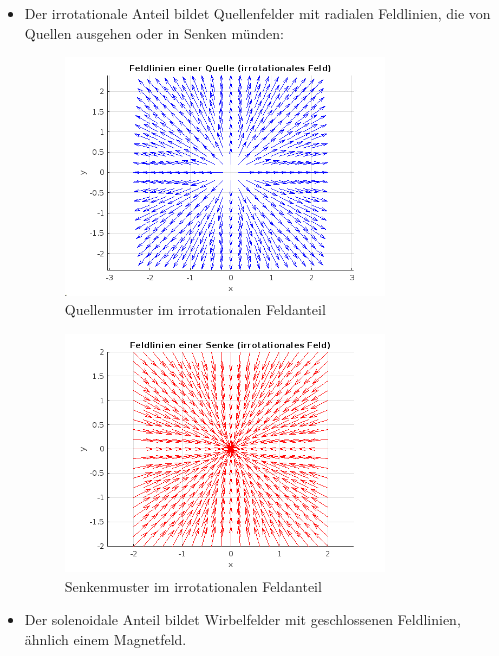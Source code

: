 \begin{itemize}
\item Der irrotationale Anteil bildet Quellenfelder mit radialen Feldlinien, die von Quellen ausgehen oder in Senken münden:
% 
\begin{figure}
\centering
\includegraphics[width=0.8\textwidth]{papers/helmholtz/images/Quelle.png}
\caption{Quellenmuster im irrotationalen Feldanteil}
\label{fig:quelle}
\end{figure}
% 
\begin{figure}
\centering
\includegraphics[width=0.8\textwidth]{papers/helmholtz/images/Senke.png}
\caption{Senkenmuster im irrotationalen Feldanteil}
\label{fig:senke}
\end{figure}
% 
\item Der solenoidale Anteil bildet Wirbelfelder mit geschlossenen Feldlinien, ähnlich einem Magnetfeld.
\end{itemize}
%  
